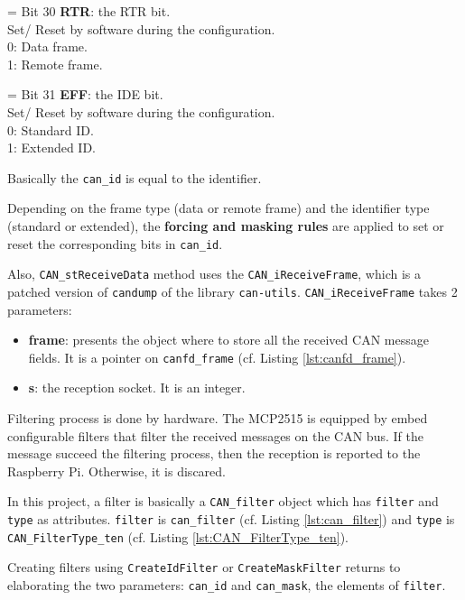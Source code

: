 \hangindent=\parindent
{}
Bit 30 \textbf{RTR}: the RTR bit. \\
Set/ Reset by software during the configuration. \\
0: Data frame. \\
1: Remote frame.

\hangindent=\parindent
{}
Bit 31 \textbf{EFF}: the IDE bit. \\
Set/ Reset by software during the configuration. \\
0: Standard ID. \\
1: Extended ID.

Basically the \texttt{can\_id} is equal to the identifier.

Depending on the frame type (data or remote frame) and the identifier type (standard or extended), the \textbf{forcing and masking rules} are applied to set or reset the corresponding bits in \texttt{can\_id}. 

Also, \texttt{CAN\_stReceiveData} method uses the \texttt{CAN\_iReceiveFrame}, which is a patched version of \texttt{candump} of the library \texttt{can-utils}.
\texttt{CAN\_iReceiveFrame} takes 2 parameters:
\begin{itemize}
    \item \textbf{frame}: presents the object where to store all the received CAN message fields. It is a pointer on \texttt{canfd\_frame} (cf. Listing \ref{lst:canfd_frame}).
    \item \textbf{s}: the reception socket. It is an integer.
\end{itemize}

Filtering process is done by hardware. The MCP2515 is equipped by embed configurable filters that filter the received messages on the CAN bus. If the message succeed the filtering process, then the reception is reported to the Raspberry Pi. Otherwise, it is discared.

In this project, a filter is basically a \texttt{CAN\_filter} object which has \texttt{filter} and  \texttt{type} as attributes. \texttt{filter} is \texttt{can\_filter} (cf. Listing \ref{lst:can_filter}) and \texttt{type} is \texttt{CAN\_FilterType\_ten} (cf. Listing \ref{lst:CAN_FilterType_ten}).

Creating filters using \texttt{CreateIdFilter} or \texttt{CreateMaskFilter} returns to elaborating the two parameters: \texttt{can\_id} and \texttt{can\_mask}, the elements of \texttt{filter}.


